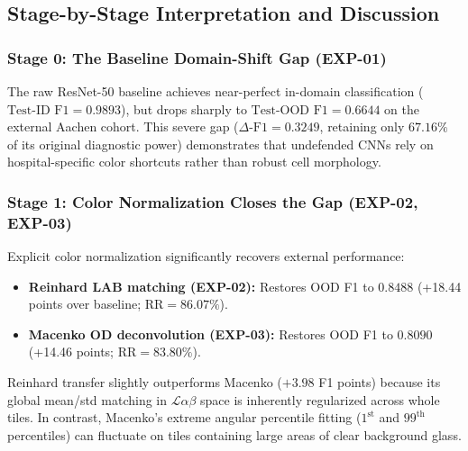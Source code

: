 \documentclass[11pt,a4paper]{article}
\begin{document}
\subsection{Stage-by-Stage Interpretation and Discussion}

\subsubsection*{Stage 0: The Baseline Domain-Shift Gap (EXP-01)}
The raw ResNet-50 baseline achieves near-perfect in-domain classification ($\text{Test-ID F1} = 0.9893$), but drops sharply to $\text{Test-OOD F1} = 0.6644$ on the external Aachen cohort. This severe gap ($\Delta\text{-F1} = 0.3249$, retaining only $67.16\%$ of its original diagnostic power) demonstrates that undefended CNNs rely on hospital-specific color shortcuts rather than robust cell morphology.

\subsubsection*{Stage 1: Color Normalization Closes the Gap (EXP-02, EXP-03)}
Explicit color normalization significantly recovers external performance:
\begin{itemize}[leftmargin=*,itemsep=1pt]
  \item \textbf{Reinhard LAB matching (EXP-02):} Restores OOD F1 to $0.8488$ (+18.44 points over baseline; $\text{RR} = 86.07\%$).
  \item \textbf{Macenko OD deconvolution (EXP-03):} Restores OOD F1 to $0.8090$ (+14.46 points; $\text{RR} = 83.80\%$).
\end{itemize}
Reinhard transfer slightly outperforms Macenko ($+3.98$ F1 points) because its global mean/std matching in $\mathcal{L}\alpha\beta$ space is inherently regularized across whole tiles. In contrast, Macenko's extreme angular percentile fitting ($1^{\text{st}}$ and $99^{\text{th}}$ percentiles) can fluctuate on tiles containing large areas of clear background glass.
\end{document}
